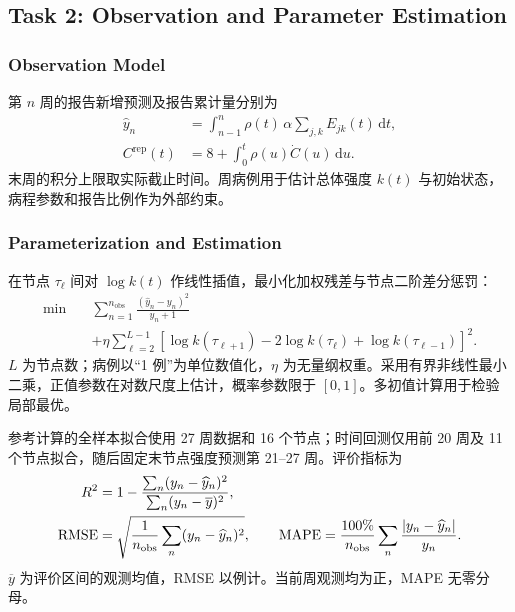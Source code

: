\subsection{Task 2: Observation and Parameter Estimation}
\label{sec:task-2}

\subsubsection{Observation Model}

第 $n$ 周的报告新增预测及报告累计量分别为
\begin{align}
\widehat y_n&=\int_{n-1}^{n}\rho(t)\,\alpha\sum_{j,k}E_{jk}(t)\,\mathrm dt,
\label{eq:weekly-observation}\\
C^{\mathrm{rep}}(t)&=8+\int_0^t\rho(u)\dot C(u)\,\mathrm du.
\label{eq:reported-cumulative}
\end{align}
末周的积分上限取实际截止时间。周病例用于估计总体强度 $k(t)$ 与初始状态，病程参数和报告比例作为外部约束。

\subsubsection{Parameterization and Estimation}

在节点 $\tau_\ell$ 间对 $\log k(t)$ 作线性插值，最小化加权残差与节点二阶差分惩罚：
\begin{equation}
\begin{split}
\min\quad &\sum_{n=1}^{n_{\mathrm{obs}}}
\frac{(\widehat y_n-y_n)^2}{y_n+1}\\
&+\eta\sum_{\ell=2}^{L-1}
\left[\log k(\tau_{\ell+1})-2\log k(\tau_\ell)
+\log k(\tau_{\ell-1})\right]^2.
\end{split}
\label{eq:fitting-objective}
\end{equation}
$L$ 为节点数；病例以“1 例”为单位数值化，$\eta$ 为无量纲权重。采用有界非线性最小二乘，正值参数在对数尺度上估计，概率参数限于 $[0,1]$。多初值计算用于检验局部最优。

参考计算的全样本拟合使用 27 周数据和 16 个节点；时间回测仅用前 20 周及 11 个节点拟合，随后固定末节点强度预测第 21--27 周。评价指标为
\begin{align}
R^2&=1-\frac{\sum_n(y_n-\widehat y_n)^2}
{\sum_n(y_n-\overline y)^2},\notag\\
\mathrm{RMSE}&=\sqrt{\frac{1}{n_{\mathrm{obs}}}
\sum_n(y_n-\widehat y_n)^2},\qquad
\mathrm{MAPE}=\frac{100\%}{n_{\mathrm{obs}}}
\sum_n\frac{|y_n-\widehat y_n|}{y_n}.
\label{eq:fit-metrics}
\end{align}
$\overline y$ 为评价区间的观测均值，RMSE 以例计。当前周观测均为正，MAPE 无零分母。

